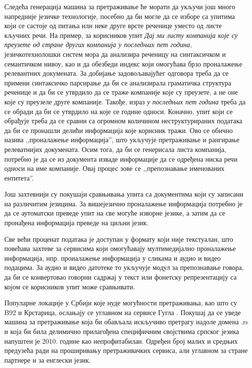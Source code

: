 {\begin{multicols}{2}

Следећа генерација машина за претраживање ће морати да укључи још много напредније језичке технологије, посебно да би могле да се изборе са упитима који се састоје од питања или неке друге врсте реченице уместо од листе кључних речи. На пример, за корисников упит \textit{Дај ми листу компанија које су преузете од стране других компанија у последњих пет година}, језичкотехнолошки систем мора да анализира реченицу на синтаксичком и семантичком нивоу, као и да обезбеди индекс који омогућава брзо проналажење релевантних докумената. За добијање задовољавајућег одговора треба да се примени синтаксичко парсирање да би се анализирала граматичка структура реченице и да би се утврдило да се траже компаније које су преузете, а не оне које су преузеле друге компаније. Такође, израз \textit{у последњих пет година} треба да се обради да би се утврдило на које се године односи. Коначно, упит који се обрађује треба да се сравни са огромном количином неструктурираних података да би се пронашли делићи информација које корисник тражи. Ово се обично назива ,,проналажење информација'', што укључује претраживање и рангирање релеватнијих докумената. Осим тога, да би се генерисала листа компанија, потребно је да се из документа  изваде информације да се одређена ниска речи односи на име компаније. Овај процес зове се ,,препознавање именованих ентитета''. 

Још захтевнији су покушаји сравњивања упита са документима који су записани на различитим језицима. За вишејезично проналажење информација потребно је да се аутоматски преведе упит на све могуће изворне језике, а затим да се пронађена информација преведе на циљни језик. 

Све већи проценат података је доступан у формату који није текстуалан, што повећава захтеве за сервисима који омогућавају мултимедијално проналажење информација, нпр. проналажење информација у сликама и аудио и видео подацима. За аудио и видео датотеке то укључује модул за препознавање говора, да би се конвертовао говорни садржај у текст или фонетску репрезентацију са којом се корисников упит може сравњивати. 

Популарне локације у Србији које нуде могућности претраживања, као што су B92 и Крстарица, ослањају се углавном на сервисе Гугла \cite{ALEXA}. Покушај да се уведе машина за претраживање која би обављала искључиво претрагу надоле домена .rs и која би била делимично прилагођена специфичним својствима српског језика напуштен је 2010. године као непрофитабилан. Одређен број малих и средњих предузећа ради на проширивању претраживачких сервиса, али углавном за стране партнере и за енглески језик. 


\end{multicols}}

